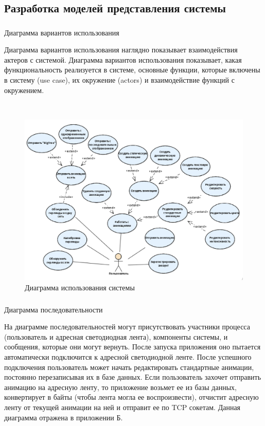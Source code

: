 \newpage
\subsection{Разработка моделей представления системы}
\label{sec:develop:umlDiagrams}

\subsubsection{} Диаграмма вариантов использования
\label{sec:develop:umlDiagrams:useCase}

Диаграмма вариантов использования наглядно показывает взаимодействия актеров с системой. Диаграмма вариантов использования показывает, какая функциональность реализуется в системе, основные функции, которые включены в систему (use case), их окружение (actors) и взаимодействие функций с окружением.

~
\begin{figure}[H]
\centering
	\includegraphics[scale=0.65]{figures/diagrams/uml_useCase.png}
	\caption{Диаграмма использования системы}
	\label{fig:develop:umlDiagrams:useCase}
\end{figure}

\subsubsection{} Диаграмма последовательности
\label{sec:develop:umlDiagrams:sequence}

На диаграмме последовательностей могут присутствовать участники процесса (пользователь и адресная светодиодная лента), компоненты системы, и сообщения, которые они могут вернуть. После запуска приложения оно пытается автоматически подключится к адресной светодиодной ленте. После успешного подключения пользователь может начать редактировать стандартные анимации, постоянно перезаписывая их в базе данных. Если пользователь захочет отправить анимацию на адресную ленту, то приложение возьмет ее из базы данных, конвертирует в байты (чтобы лента могла ее воспроизвести), отчистит адресную ленту от текущей анимации на ней и отправит ее по TCP сокетам. Данная диаграмма отражена в приложении Б.

